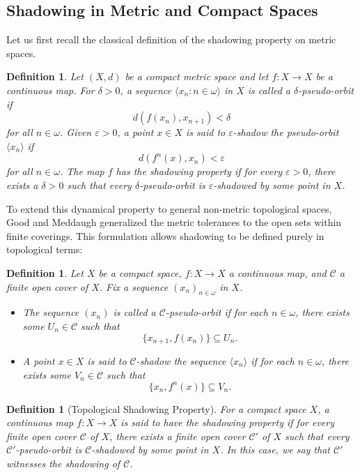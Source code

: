 \documentclass[10pt,a4paper]{amsart}
\newtheorem{definition}[theorem]{Definition}
\numberwithin{equation}{section}
\begin{document}
\subsection{Shadowing in Metric and Compact Spaces}
 Let us first recall the classical definition of the shadowing property on metric spaces.

\begin{definition}\label{shadmet}
Let $(X, d)$ be a compact metric space and let $f:X \to X$ be a continuous map. For $\delta > 0$, a sequence $\langle x_n : n \in \omega \rangle$ in $X$ is called a \emph{$\delta$-pseudo-orbit} if 
\[
d(f(x_n), x_{n+1}) < \delta
\]
for all $n \in \omega$. Given $\varepsilon > 0$, a point $x \in X$ is said to \emph{$\varepsilon$-shadow} the pseudo-orbit $\langle x_n \rangle$ if 
\[
d(f^n(x), x_n) < \varepsilon
\]
for all $n \in \omega$. The map $f$ has the \emph{shadowing property} if for every $\varepsilon > 0$, there exists a $\delta > 0$ such that every $\delta$-pseudo-orbit is $\varepsilon$-shadowed by some point in $X$.
\end{definition}

To extend this dynamical property to general non-metric topological spaces, Good and Meddaugh \cite{GM} generalized the metric tolerances to the open sets within finite coverings. This formulation allows shadowing to be defined purely in topological terms:

\begin{definition}\label{shadcom}
Let $X$ be a compact space, $f: X \to X$ a continuous map, and $\mathcal{C}$ a finite open cover of $X$. Fix a sequence $(x_n)_{n \in \omega}$ in $X$.
\begin{itemize}
\item The sequence $(x_n)$ is called a \emph{$\mathcal{C}$-pseudo-orbit} if for each $n \in \omega$, there exists some $U_n \in \mathcal{C}$ such that 
\[
\{x_{n+1}, f(x_n)\} \subseteq U_n.
\]
\item A point $x \in X$ is said to \emph{$\mathcal{C}$-shadow} the sequence $\langle x_n \rangle$ if for each $n \in \omega$, there exists some $V_n \in \mathcal{C}$ such that 
\[
\{x_n, f^n(x)\} \subseteq V_n.
\]
\end{itemize}
\end{definition}

\begin{definition}[Topological Shadowing Property]
For a compact space $X$, a continuous map $f: X \to X$ is said to have the \emph{shadowing property} if for every finite open cover $\mathcal{C}$ of $X$, there exists a finite open cover $\mathcal{C}'$ of $X$ such that every $\mathcal{C}'$-pseudo-orbit is $\mathcal{C}$-shadowed by some point in $X$. In this case, we say that $\mathcal{C}'$ \emph{witnesses the shadowing of $\mathcal{C}$}.
\end{definition}
\end{document}
